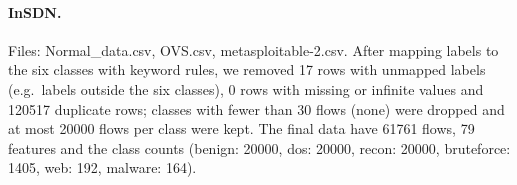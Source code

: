 \paragraph{InSDN.} Files: Normal_data.csv, OVS.csv, metasploitable-2.csv. After mapping labels to the six classes with keyword rules, we removed 17 rows with unmapped labels (e.g.\ labels outside the six classes), 0 rows with missing or infinite values and 120517 duplicate rows; classes with fewer than 30 flows (none) were dropped and at most 20000 flows per class were kept. The final data have 61761 flows, 79 features and the class counts (benign: 20000, dos: 20000, recon: 20000, bruteforce: 1405, web: 192, malware: 164).
